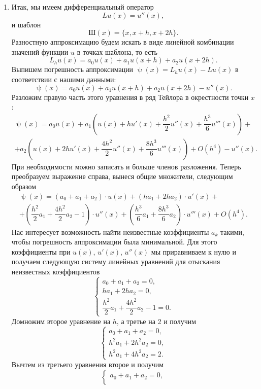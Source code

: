 \documentclass[a4paper, 12pt]{article}
\renewcommand{\psi}{\uppsi}
\begin{document}
\begin{enumerate}
\begin{enumerate}
		\end{enumerate}
		\newpage
		\item \hypertarget{t1}{}
		Итак, мы имеем дифференциальный оператор $$Lu(x) = u''(x),$$ и шаблон $$\text{Ш}(x) = \{x, x+h, x+2h\}.$$ Разностную аппроксимацию будем искать в виде линейной комбинации значений функции $u$ в точках шаблона, то есть $$L_h u(x) = a_0 u(x) + a_1 u(x+h) + a_2 u(x+2h).$$ Выпишем погрешность аппроксимации $\psi(x) = L_h u(x) - L u(x)$ в соответствии с нашими данными: $$\psi(x) = a_0 u(x) + a_1 u(x+h) + a_2 u(x+2h) - u''(x).$$
		Разложим правую часть этого уравнения в ряд Тейлора в окрестности точки $x$:
		\begin{multline*}
			\psi(x) = a_0 u(x) + a_1 \left(u(x) + h u'(x) + \dfrac{h^2}{2}u''(x) + \dfrac{h^3}{6}u'''(x)\right) +\\+ a_2 \left(u(x) + 2h u'(x) + \dfrac{4h^2}{2}u''(x) + \dfrac{8h^3}{6}u'''(x)\right) + O(h^4) - u''(x) .
		\end{multline*}
		При необходимости можно записать и больше членов разложения. Теперь преобразуем выражение справа, вынеся общие множители, следующим образом
		\begin{multline*}
			\psi(x) = (a_0 + a_1 + a_2)\cdot u(x) + (ha_1 + 2ha_2)\cdot  u'(x) +\\+ \left(\dfrac{h^2}{2}a_1 + \dfrac{4h^2}{2}a_2 - 1\right)\cdot u''(x) + \left(\dfrac{h^3}{6}a_1 +\dfrac{8h^3}{6}a_2\right)\cdot u'''(x) +O(h^4).
		\end{multline*}
		Нас интересует возможность найти неизвестные коэффициенты $a_k$ такими, чтобы погрешность аппроксимации была минимальной. Для этого коэффициенты при $u(x)$, $u'(x)$, $u''(x)$ мы приравниваем к нулю и получаем следующую систему линейных уравнений для отыскания неизвестных коэффициентов 
		$$\begin{cases}
			a_0 + a_1 + a_2 = 0,\\
			ha_1  + 2ha_2  = 0,\\
			\dfrac{h^2}{2}a_1 + \dfrac{4h^2}{2}a_2 - 1 = 0.
		\end{cases}$$
		Домножим второе уравнение на $h$, а третье на 2 и получим
		$$\begin{cases}
			a_0 + a_1 + a_2 = 0,\\
			h^2 a_1+ 2 h^2 a_2= 0,\\
			h^2 a_1 + 4h^2a_2 = 2.
		\end{cases}$$
		Вычтем из третьего уравнения второе и получим 
		$$\begin{cases}
			a_0 + a_1 + a_2 = 0,\\

\end{cases}$$
\end{enumerate}
\end{document}
